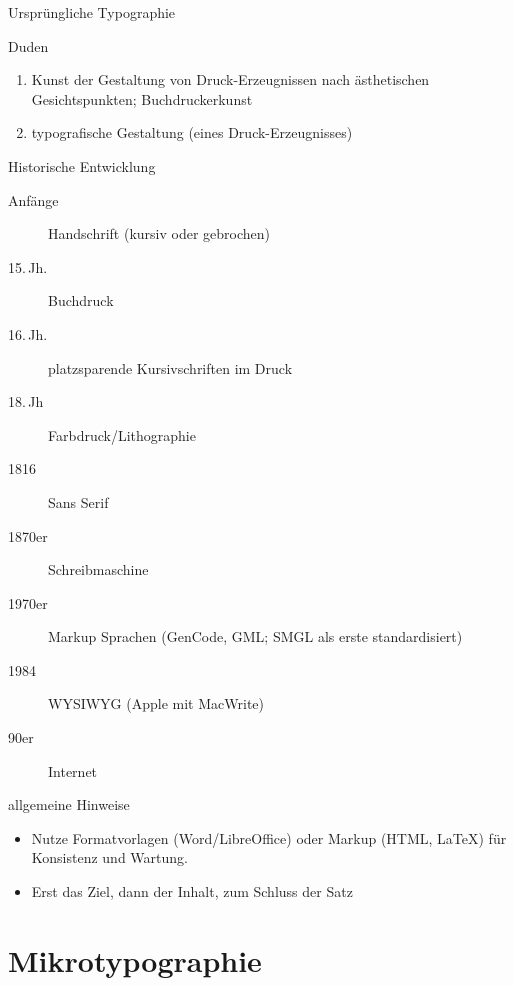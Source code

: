 \documentclass[ngerman,draft, usepdftitle=true]{beamer}
\begin{document}
\begin{frame}{Ursprüngliche Typographie}
  \begin{block}{Duden}
    \begin{enumerate}
    \item Kunst der Gestaltung von Druck-Erzeugnissen nach
      ästhetischen Gesichtspunkten; \alert{Buchdruckerkunst}
    \item typografische Gestaltung (eines Druck-Erzeugnisses)
    \end{enumerate}
  \end{block}
\end{frame}
\begin{frame}{Historische Entwicklung}
  \begin{description}
    \item[Anfänge] Handschrift (kursiv oder gebrochen)
    \item[15.\,Jh.] Buchdruck
    \item[16.\,Jh.] platzsparende Kursivschriften im Druck
    \item[18.\,Jh] Farbdruck/Lithographie 
    \item[1816] Sans Serif 
    \item[1870er] Schreibmaschine 
    \item[1970er] Markup Sprachen (GenCode, GML; SMGL als erste standardisiert)
    \item[1984] WYSIWYG (Apple mit MacWrite)
    \item[90er] Internet
  \end{description}
\end{frame}



\begin{frame}{allgemeine Hinweise}
  \begin{itemize}
  \item<1-> Nutze Formatvorlagen (Word/LibreOffice) oder Markup (HTML,
    LaTeX) für Konsistenz und Wartung.
  \item<2-> Erst das Ziel, dann der Inhalt, zum Schluss der Satz
  \end{itemize}
\end{frame}

\section{Mikrotypographie}
\end{document}
